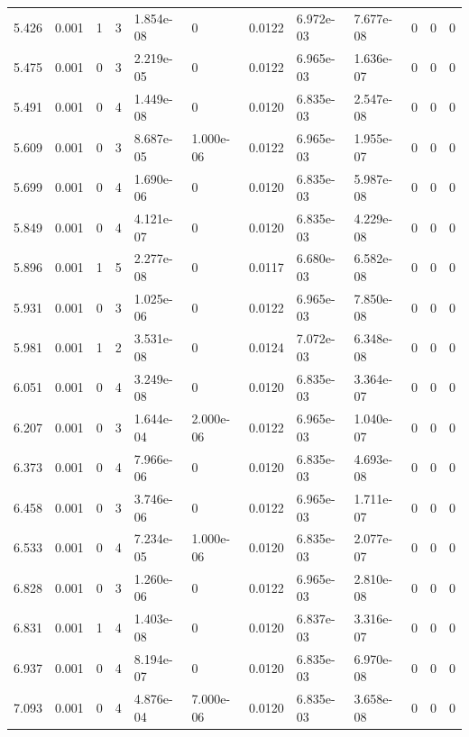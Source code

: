 \documentclass[preview]{standalone}
\begin{document}
{{{\begin{tabular}{L{1.2cm}C{1.2cm} C{0.3cm}C{0.5cm} C{1.4cm}C{1.4cm} C{1.4cm}C{1.4cm} C{1.6cm}C{1.6cm} C{1.6cm}C{1.6cm}}
  5.426  &  0.001  & 1     &  3 &  1.854e-08  & 0  &  0.0122&   6.972e-03& 7.677e-08 & 0   &  0 & 0  \\ 
  5.475  &  0.001  & 0     &  3 &  2.219e-05  & 0  &  0.0122&   6.965e-03& 1.636e-07 & 0   &  0 & 0  \\ 
  5.491  &  0.001  & 0     &  4 &  1.449e-08  & 0  &  0.0120&   6.835e-03& 2.547e-08 & 0   &  0 & 0  \\ 
  5.609  &  0.001  & 0     &  3 &  8.687e-05  & 1.000e-06  &  0.0122&   6.965e-03& 1.955e-07 & 0   &  0 & 0  \\ 
  5.699  &  0.001  & 0     &  4 &  1.690e-06  & 0  &  0.0120&   6.835e-03& 5.987e-08 & 0   &  0 & 0  \\ 
  5.849  &  0.001  & 0     &  4 &  4.121e-07  & 0  &  0.0120&   6.835e-03& 4.229e-08 & 0   &  0 & 0  \\ 
  5.896  &  0.001  & 1     &  5 &  2.277e-08  & 0  &  0.0117&   6.680e-03& 6.582e-08 & 0   &  0 & 0  \\ 
  5.931  &  0.001  & 0     &  3 &  1.025e-06  & 0  &  0.0122&   6.965e-03& 7.850e-08 & 0   &  0 & 0  \\ 
  5.981  &  0.001  & 1     &  2 &  3.531e-08  & 0  &  0.0124&   7.072e-03& 6.348e-08 & 0   &  0 & 0  \\ 
  6.051  &  0.001  & 0     &  4 &  3.249e-08  & 0  &  0.0120&   6.835e-03& 3.364e-07 & 0   &  0 & 0  \\ 
  6.207  &  0.001  & 0     &  3 &  1.644e-04  & 2.000e-06  &  0.0122&   6.965e-03& 1.040e-07 & 0   &  0 & 0  \\ 
  6.373  &  0.001  & 0     &  4 &  7.966e-06  & 0  &  0.0120&   6.835e-03& 4.693e-08 & 0   &  0 & 0  \\ 
  6.458  &  0.001  & 0     &  3 &  3.746e-06  & 0  &  0.0122&   6.965e-03& 1.711e-07 & 0   &  0 & 0  \\ 
  6.533  &  0.001  & 0     &  4 &  7.234e-05  & 1.000e-06  &  0.0120&   6.835e-03& 2.077e-07 & 0   &  0 & 0  \\ 
  6.828  &  0.001  & 0     &  3 &  1.260e-06  & 0  &  0.0122&   6.965e-03& 2.810e-08 & 0   &  0 & 0  \\ 
  6.831  &  0.001  & 1     &  4 &  1.403e-08  & 0  &  0.0120&   6.837e-03& 3.316e-07 & 0   &  0 & 0  \\ 
  6.937  &  0.001  & 0     &  4 &  8.194e-07  & 0  &  0.0120&   6.835e-03& 6.970e-08 & 0   &  0 & 0  \\ 
  7.093  &  0.001  & 0     &  4 &  4.876e-04  & 7.000e-06  &  0.0120&   6.835e-03& 3.658e-08 & 0   &  0 & 0  \\ 

\end{tabular}}}}
\end{document}
